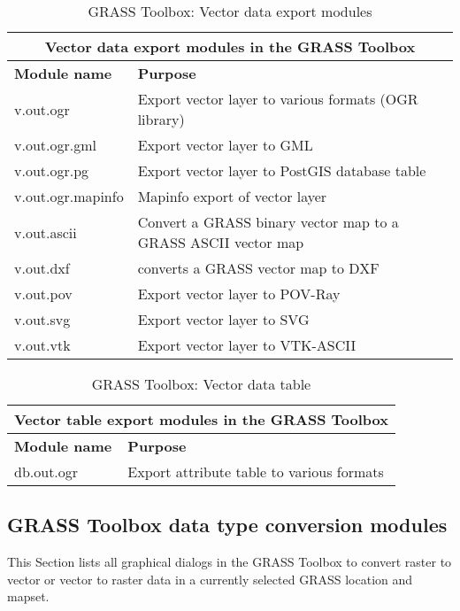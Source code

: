 \newpage

\begin{table}[ht]
\centering
\caption{GRASS Toolbox: Vector data export modules}\medskip
 \begin{tabular}{|p{4cm}|p{12cm}|}
  \hline \multicolumn{2}{|c|}{\textbf{Vector data export modules in the GRASS
Toolbox}} \\
  \hline \textbf{Module name} & \textbf{Purpose} \\
  \hline v.out.ogr & Export vector layer to various formats (OGR library) \\
  \hline v.out.ogr.gml & Export vector layer to GML \\
  \hline v.out.ogr.pg & Export vector layer to PostGIS database table \\
  \hline v.out.ogr.mapinfo & Mapinfo export of vector layer \\
  \hline v.out.ascii & Convert a GRASS binary vector map to a GRASS ASCII
  vector map  \\
  \hline v.out.dxf & converts a GRASS vector map to DXF  \\
  \hline v.out.pov & Export vector layer to POV-Ray \\
  \hline v.out.svg & Export vector layer to SVG \\
  \hline v.out.vtk & Export vector layer to VTK-ASCII \\
\hline
\end{tabular}
\end{table}

\begin{table}[ht]
\centering
\caption{GRASS Toolbox: Vector data table}\medskip
 \begin{tabular}{|p{4cm}|p{12cm}|}
  \hline \multicolumn{2}{|c|}{\textbf{Vector table export modules in the
GRASS Toolbox}} \\
  \hline \textbf{Module name} & \textbf{Purpose} \\
  \hline db.out.ogr & Export attribute table to various formats  \\
\hline
\end{tabular}
\end{table}

\newpage

\subsection{GRASS Toolbox data type conversion modules}

This Section lists all graphical dialogs in the GRASS Toolbox to convert
raster to vector or vector to raster data in a currently selected GRASS location 
and mapset.

